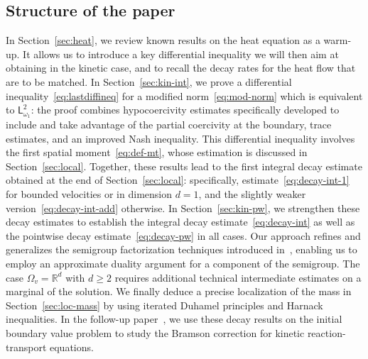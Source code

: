 \documentclass[11pt]{amsart}
\theoremstyle{definition}
\theoremstyle{remark}
\numberwithin{equation}{section}
\newcommand\R{{\mathbb R}}
\newcommand{\sfL}{\mathsf{L}}
\begin{document}
\subsection{Structure of the paper}

In Section~\ref{sec:heat}, we review known results on the heat equation as a warm-up. It allows us to introduce a key differential inequality we will then aim at obtaining in the kinetic case, and to recall the decay rates for the heat flow that are to be matched. In Section~\ref{sec:kin-int}, we prove a differential inequality~\eqref{eq:lastdiffineq} for a modified norm~\eqref{eq:mod-norm} which is equivalent to $\sfL^2_{\omega_1}$: the proof combines hypocoercivity estimates specifically developed to include and take advantage of the partial coercivity at the boundary, trace estimates, and an improved Nash inequality. This differential inequality involves the first spatial moment~\eqref{eq:def-mt}, whose estimation is discussed in Section~\ref{sec:local}. Together, these results lead to the first integral decay estimate obtained at the end of Section~\ref{sec:local}: specifically, estimate~\eqref{eq:decay-int-1} for bounded velocities or in dimension $d=1$, and the slightly weaker version~\eqref{eq:decay-int-add} otherwise. In Section~\ref{sec:kin-pw}, we strengthen these decay estimates to establish the integral decay estimate~\eqref{eq:decay-int} as well as the pointwise decay estimate~\eqref{eq:decay-pw} in all cases. Our approach refines and generalizes the semigroup factorization techniques introduced in~\cite{MR3779780, MisMou}, enabling us to employ an approximate duality argument for a component of the semigroup. The case $\Omega_v=\R^d$ with $d\ge2$ requires additional technical intermediate estimates on a marginal of the solution. We finally deduce a precise localization of the mass in Section~\ref{sec:loc-mass} by using iterated Duhamel principles and Harnack inequalities. In the follow-up paper~\cite{BMM_delay}, we use these decay results on the initial boundary value problem to study the Bramson correction for kinetic reaction-transport equations.
\end{document}
